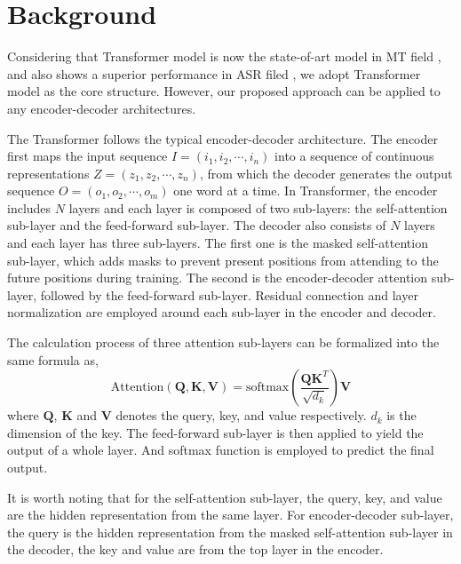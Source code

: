 \documentclass[letterpaper]{article} %
\begin{document}
\section{Background}
\label{sec:transformer}
Considering that Transformer model is now the state-of-art model in MT field \cite{vaswani2017attention}, and also shows a superior performance in ASR filed  \cite{dong2018speech,zhou2018syllable}, we adopt Transformer model as the core structure.  However, our proposed approach can be applied to any encoder-decoder architectures.

The Transformer follows the typical encoder-decoder architecture. The encoder first maps the input sequence $\mathbf{\mathit{I}}=(i_1,i_2,\cdots,i_n)$ into a sequence of continuous representations $\mathbf{\mathit{Z}}=(z_1,z_2,\cdots,z_n)$, from which  the decoder generates the output sequence $\mathbf{\mathit{O}}=(o_1,o_2,\cdots,o_m)$ one word at a time. In Transformer, the encoder includes $N$ layers and each layer is composed of two sub-layers: the self-attention sub-layer and the feed-forward sub-layer.
The decoder also consists of $N$ layers and each layer has three sub-layers. The first one is the masked self-attention sub-layer, which adds masks to prevent present positions from attending to the future positions during training. The second is the encoder-decoder attention sub-layer, followed by the feed-forward sub-layer. Residual connection and layer normalization are employed around each sub-layer in the encoder and decoder.

The calculation process of three attention sub-layers can be formalized into the same formula as,
\begin{equation}
\mathrm{Attention(\mathbf{Q},\mathbf{K},\mathbf{V})}=\mathrm{softmax}(\frac{\mathbf{Q}\mathbf{K}^T}{\sqrt{d_k}})\mathbf{V}
\label{equ:Attention}
\end{equation}
where $\mathbf{Q}$, $\mathbf{K}$ and $\mathbf{V}$ denotes the query, key, and value respectively. $d_k$ is the dimension of the key.
The feed-forward sub-layer is then applied to yield the output of a whole layer. And softmax function is employed to predict the final output.

It is worth noting that for the self-attention sub-layer, the query, key, and value are the hidden representation from the same layer. For encoder-decoder sub-layer, the query is the hidden representation from the masked self-attention sub-layer in the decoder, the key and value are from the top layer in the encoder.
\end{document}
